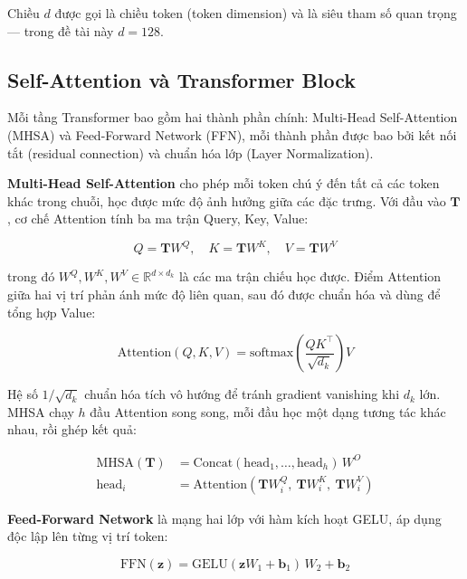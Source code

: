 \documentclass[../DoAn.tex]{subfiles}
\begin{document}
Chiều $d$ được gọi là chiều token (token dimension) và là siêu tham số quan trọng --- trong đề tài này $d = 128$.

\subsection{Self-Attention và Transformer Block}
\label{subsec:ftt-attn}

Mỗi tầng Transformer bao gồm hai thành phần chính: Multi-Head Self-Attention (MHSA) và Feed-Forward Network (FFN), mỗi thành phần được bao bởi kết nối tắt (residual connection) và chuẩn hóa lớp (Layer Normalization).

\textbf{Multi-Head Self-Attention} cho phép mỗi token chú ý đến tất cả các token khác trong chuỗi, học được mức độ ảnh hưởng giữa các đặc trưng. Với đầu vào $\mathbf{T}$, cơ chế Attention tính ba ma trận Query, Key, Value:

\begin{equation}
    Q = \mathbf{T} W^Q, \quad K = \mathbf{T} W^K, \quad V = \mathbf{T} W^V
    \label{eq:qkv}
\end{equation}

trong đó $W^Q, W^K, W^V \in \mathbb{R}^{d \times d_k}$ là các ma trận chiếu học được. Điểm Attention giữa hai vị trí phản ánh mức độ liên quan, sau đó được chuẩn hóa và dùng để tổng hợp Value:

\begin{equation}
    \text{Attention}(Q, K, V) = \text{softmax}\!\left(\frac{QK^\top}{\sqrt{d_k}}\right) V
    \label{eq:attention}
\end{equation}

Hệ số $1/\sqrt{d_k}$ chuẩn hóa tích vô hướng để tránh gradient vanishing khi $d_k$ lớn. MHSA chạy $h$ đầu Attention song song, mỗi đầu học một dạng tương tác khác nhau, rồi ghép kết quả:

\begin{align}
    \text{MHSA}(\mathbf{T}) &= \text{Concat}(\text{head}_1, \ldots, \text{head}_h)\, W^O \label{eq:mhsa} \\
    \text{head}_i &= \text{Attention}(\mathbf{T} W_i^Q,\ \mathbf{T} W_i^K,\ \mathbf{T} W_i^V) \label{eq:head}
\end{align}

\textbf{Feed-Forward Network} là mạng hai lớp với hàm kích hoạt GELU, áp dụng độc lập lên từng vị trí token:

\begin{equation}
    \text{FFN}(\mathbf{z}) = \text{GELU}(\mathbf{z} W_1 + \mathbf{b}_1)\, W_2 + \mathbf{b}_2
    \label{eq:ffn}
\end{equation}
\end{document}
